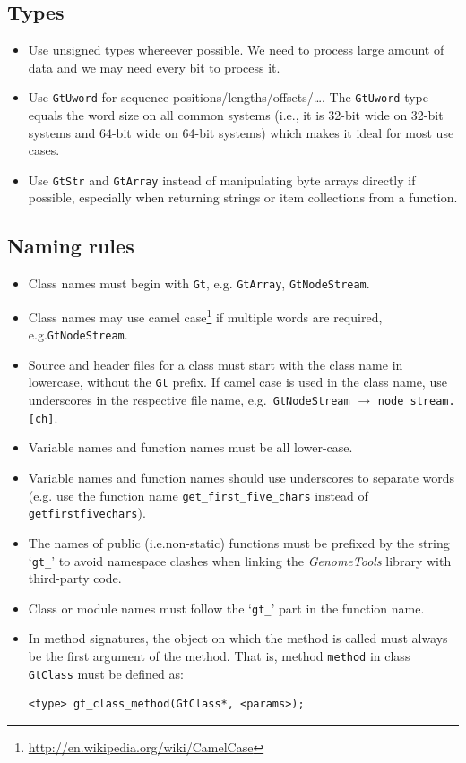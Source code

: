 \documentclass[11pt,final]{article}
\newcommand{\keyword}[1]{\lstinline{#1}}
\newcommand{\Gt}[0]{\emph{GenomeTools}\xspace}
\begin{document}
\subsection{Types}
\begin{itemize}
\item
Use unsigned types whereever possible. We need to process large amount
of data and we may need every bit to process it.
\item
Use \keyword{GtUword} for sequence positions/lengths/offsets/\dots .
The \keyword{GtUword} type equals the word size on all common systems
(i.e., it is 32-bit wide on 32-bit systems and 64-bit wide on 64-bit systems)
which makes it ideal for most use cases.
\item
Use \keyword{GtStr} and \keyword{GtArray} instead of manipulating byte arrays
directly if possible, especially when returning strings or item collections
from a function.
\end{itemize}

\subsection{Naming rules}
\begin{itemize}
\item
Class names must begin with \keyword{Gt}, e.g. \keyword{GtArray},
\keyword{GtNodeStream}.
\item
Class names may use camel
case\footnote{\url{http://en.wikipedia.org/wiki/CamelCase}} if multiple words
are required, e.g.\@ \keyword{GtNodeStream}.
\item
Source and header files for a class must start with the class name in
lowercase, without the \keyword{Gt} prefix. If camel case is used in the class
name, use underscores in the respective file name, e.g.\
\keyword{GtNodeStream} $\to$ \keyword{node_stream.[ch]}.
\item
Variable names and function names must be all lower-case.
\item
Variable names and function names should use underscores to separate words
(e.g. use the function name \keyword{get_first_five_chars} instead of
\keyword{getfirstfivechars}).
\item
The names of public (i.e.\@ non-static) functions must be prefixed by the string
`\keyword{gt_}' to avoid namespace clashes when linking the \Gt library with
third-party code.
\item
Class or module names must follow the `\keyword{gt_}' part in the function name.
\item
In method signatures, the object on which the method is called must always be
the first argument of the method.
That is, method \keyword{method} in class \keyword{GtClass} must be defined as:
\begin{lstlisting}
<type> gt_class_method(GtClass*, <params>);
\end{lstlisting}
\end{itemize}
\end{document}
